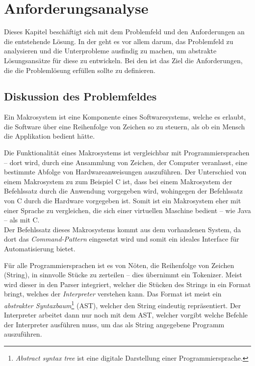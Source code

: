 \section{An\-for\-de\-rungs\-ana\-ly\-se}
\label{sec:Anforderungsanalyse}
  Dieses Kapitel beschäftigt sich mit dem Problemfeld und den Anforderungen an die entstehende Lösung. In der  geht es vor allem darum, das Problemfeld zu analysieren und die Unterprobleme ausfindig zu machen, um abstrakte Lösungsansätze für diese zu entwickeln. Bei den  ist das Ziel die Anforderungen, die die Problemlösung erfüllen sollte zu definieren.

  \subsection{Diskussion des Problemfeldes}
  \label{ssec:Diskussion des Problemfeldes}
    Ein Makrosystem ist eine Komponente eines Softwaresystems, welche es erlaubt, die Software über eine Reihenfolge von Zeichen so zu steuern, als ob ein Mensch die Applikation bedient hätte.

    Die Funktionalität eines Makrosystems ist vergleichbar mit Programmiersprachen -- dort wird, durch eine Ansammlung von Zeichen, der Computer veranlasst, eine bestimmte Abfolge von Hardwareanweisungen auszuführen. Der Unterschied von einem Makrosystem zu zum Beispiel C ist, dass bei einem Makrosystem der Befehlssatz durch die Anwendung vorgegeben wird, wohingegen der Befehlssatz von C durch die Hardware vorgegeben ist. Somit ist ein Makrosystem eher mit einer Sprache zu vergleichen, die sich einer virtuellen Maschine bedient -- wie Java -- als mit C.\\
    Der Befehlssatz dieses Makrosystems kommt aus dem vorhandenen System, da dort das \emph{Command-Pattern}\autocite[S.263]{Gamma:1995:DPE:186897} eingesetzt wird und somit ein ideales Interface für Automatisierung bietet.

    Für alle Programmiersprachen ist es von Nöten, die Reihenfolge von Zeichen (String), in sinnvolle Stücke zu zerteilen -- dies übernimmt ein Tokenizer. Meist wird dieser in den Parser\autocite[S.46]{eirund2013formale}
    integriert, welcher die Stücken des Strings in ein Format bringt, welches der \emph{Interpreter}\autocite[S.274]{Gamma:1995:DPE:186897} verstehen kann. Das Format ist meist ein \emph{abstrakter Syntaxbaum}\footnote{%
      \textit{Abstract syntax tree} ist eine digitale Darstellung einer Programmiersprache.
    } (AST), welcher den String eindeutig repräsentiert. Der Interpreter arbeitet dann nur noch mit dem AST, welcher vorgibt welche Befehle der Interpreter ausführen muss, um das als String angegebene Programm auszuführen.

